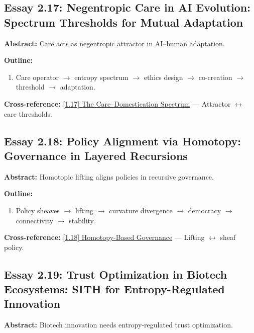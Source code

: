 \documentclass[12pt,a4paper]{article}
\begin{document}
\subsection{Essay 2.17: Negentropic Care in AI Evolution: Spectrum Thresholds for Mutual Adaptation}
\label{sec:essay2-17}

\textbf{Abstract:} Care acts as negentropic attractor in AI--human adaptation.

\textbf{Outline:}
\begin{enumerate}
\item Care operator $\to$ entropy spectrum $\to$ ethics design $\to$ co-creation $\to$ threshold $\to$ adaptation.
\end{enumerate}

\textbf{Cross-reference:} \hyperref[sec:essay1-17]{[1.17] The Care--Domestication Spectrum} --- Attractor $\leftrightarrow$ care thresholds.

\subsection{Essay 2.18: Policy Alignment via Homotopy: Governance in Layered Recursions}
\label{sec:essay2-18}

\textbf{Abstract:} Homotopic lifting aligns policies in recursive governance.

\textbf{Outline:}
\begin{enumerate}
\item Policy sheaves $\to$ lifting $\to$ curvature divergence $\to$ democracy $\to$ connectivity $\to$ stability.
\end{enumerate}

\textbf{Cross-reference:} \hyperref[sec:essay1-18]{[1.18] Homotopy-Based Governance} --- Lifting $\leftrightarrow$ sheaf policy.

\subsection{Essay 2.19: Trust Optimization in Biotech Ecosystems: SITH for Entropy-Regulated Innovation}
\label{sec:essay2-19}

\textbf{Abstract:} Biotech innovation needs entropy-regulated trust optimization.
\end{document}
